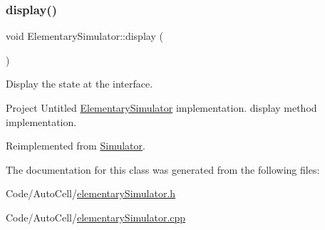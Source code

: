 \subsubsection{\texorpdfstring{display()}{display()}}
{\footnotesize\ttfamily void Elementary\+Simulator\+::display (\begin{DoxyParamCaption}{ }\end{DoxyParamCaption})\hspace{0.3cm}{\ttfamily [virtual]}}

Display the state at the interface.

Project Untitled \mbox{\hyperlink{class_elementary_simulator}{Elementary\+Simulator}} implementation. display method implementation. 

Reimplemented from \mbox{\hyperlink{class_simulator_ae67f79cd49d6636f57761eec3b2656b5}{Simulator}}.



The documentation for this class was generated from the following files\+:\begin{DoxyCompactItemize}
\item 
Code/\+Auto\+Cell/\mbox{\hyperlink{elementary_simulator_8h}{elementary\+Simulator.\+h}}\item 
Code/\+Auto\+Cell/\mbox{\hyperlink{elementary_simulator_8cpp}{elementary\+Simulator.\+cpp}}\end{DoxyCompactItemize}
